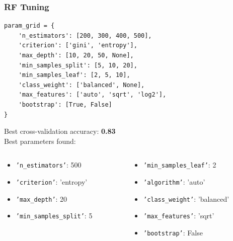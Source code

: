 \documentclass{beamer}
\begin{document}
\begin{frame}[fragile]
\frametitle{RF Tuning}
\lstset{style=PythonStyle}
\begin{lstlisting}
param_grid = {
    'n_estimators': [200, 300, 400, 500],
    'criterion': ['gini', 'entropy'],
    'max_depth': [10, 20, 50, None],
    'min_samples_split': [5, 10, 20],
    'min_samples_leaf': [2, 5, 10],
    'class_weight': ['balanced', None],
    'max_features': ['auto', 'sqrt', 'log2'],
    'bootstrap': [True, False]
}
\end{lstlisting}
Best cross-validation accuracy: \textbf{0.83} \\
Best parameters found: 
\begin{columns}
    \begin{column}{0.5\textwidth}
        \begin{itemize}
            \item \texttt{'n\_estimators'}: 500
            \item \texttt{'criterion'}: 'entropy'
            \item \texttt{'max\_depth'}: 20
            \item \texttt{'min\_samples\_split'}: 5
        \end{itemize}
    \end{column}
    \begin{column}{0.5\textwidth}
        \begin{itemize}
            \item \texttt{'min\_samples\_leaf'}: 2
            \item \texttt{'algorithm'}: 'auto'
            \item \texttt{'class\_weight'}: 'balanced'
            \item \texttt{'max\_features'}: 'sqrt'
            \item \texttt{'bootstrap'}: False
        \end{itemize}
    \end{column}
\end{columns}

\end{frame}
\end{document}
